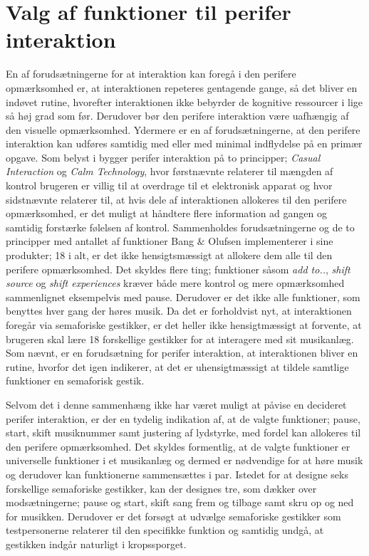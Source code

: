 \section{Valg af funktioner til perifer interaktion}
\label{DiskussionFunktionerCasualInteraction}
%
En af forudsætningerne for at interaktion kan foregå i den perifere opmærksomhed er, at interaktionen repeteres gentagende gange, så det bliver en indøvet rutine, hvorefter interaktionen ikke bebyrder de kognitive ressourcer i lige så høj grad som før. Derudover bør den perifere interaktion være uafhængig af den visuelle opmærksomhed. Ydermere er en af forudsætningerne, at den perifere interaktion kan udføres samtidig med eller med minimal indflydelse på en primær opgave. Som belyst i  bygger perifer interaktion på to principper; \textit{Casual Interaction} og \textit{Calm Technology}, hvor førstnævnte relaterer til mængden af kontrol brugeren er villig til at overdrage til et elektronisk apparat og hvor sidstnævnte relaterer til, at hvis dele af interaktionen allokeres til den perifere opmærksomhed, er det muligt at håndtere flere information ad gangen og samtidig forstærke følelsen af kontrol. Sammenholdes forudsætningerne og de to principper med antallet af funktioner Bang $\&$ Olufsen implementerer i sine produkter; 18 i alt, er det ikke hensigtsmæssigt at allokere dem alle til den perifere opmærksomhed. Det skyldes flere ting; funktioner såsom \textit{add to..}, \textit{shift source} og \textit{shift experiences} kræver både mere kontrol og mere opmærksomhed sammenlignet eksempelvis med pause. Derudover er det ikke alle funktioner, som benyttes hver gang der høres musik. Da det er forholdvist nyt, at interaktionen foregår via semaforiske gestikker, er det heller ikke hensigtmæssigt at forvente, at brugeren skal lære 18 forskellige gestikker for at interagere med sit musikanlæg. Som nævnt, er en forudsætning for perifer interaktion, at interaktionen bliver en rutine, hvorfor det igen indikerer, at det er uhensigtmæssigt at tildele samtlige funktioner en semaforisk gestik. 

Selvom det i denne sammenhæng ikke har været muligt at påvise en decideret perifer interaktion, er der en tydelig indikation af, at de valgte funktioner; pause, start, skift musiknummer samt justering af lydstyrke, med fordel kan allokeres til den perifere opmærksomhed. Det skyldes formentlig, at de valgte funktioner er universelle funktioner i et musikanlæg og dermed er nødvendige for at høre musik og derudover kan funktionerne sammensættes i par. Istedet for at designe seks forskellige semaforiske gestikker, kan der designes tre, som dækker over modsætningerne; pause og start, skift sang frem og tilbage samt skru op og ned for musikken. Derudover er det forsøgt at udvælge semaforiske gestikker som testpersonerne relaterer til den specifikke funktion og samtidig undgå, at gestikken indgår naturligt i kropssporget.  

